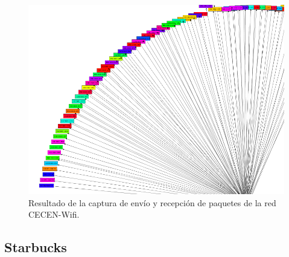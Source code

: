 \documentclass[10pt, a4paper]{article}
\begin{document}
\begin{figure}[H] %
\begin{center}
\includegraphics[width=400pt]{../imgs/cecen_arriba.png}
\caption{Resultado de la captura de envío y recepción de paquetes de la red CECEN-Wifi.}
\end{center}
\end{figure}

\subsection{Starbucks}
\end{document}
